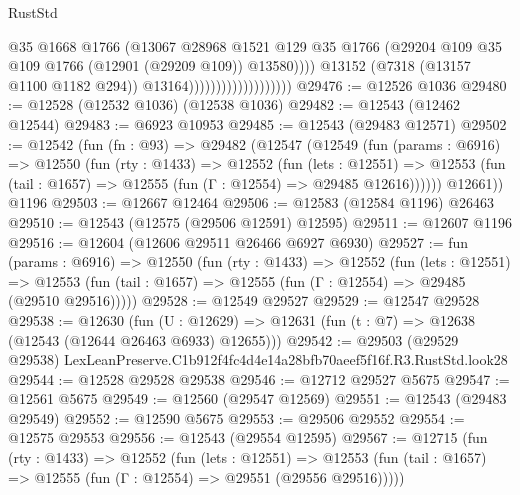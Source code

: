 \begin{lexlean}{RustStd}
\begin{coremodule}
                                              @35
                                              @1668
                                              @1766
                                              (@13067
                                                @28968
                                                @1521
                                                @129
                                                @35
                                                @1766
                                                (@29204
                                                  @109
                                                  @35
                                                  @109
                                                  @1766
                                                  (@12901 (@29209 @109))
                                                  @13580))))
                                          @13152
                                          (@7318 (@13157 @1100 @1182 @294))
                                          @13164)))))))))))))))))))
@29476 := @12526 @1036
@29480 := @12528 (@12532 @1036) (@12538 @1036)
@29482 := @12543 (@12462 @12544)
@29483 := @6923 @10953
@29485 := @12543 (@29483 @12571)
@29502 := @12542
    (fun (fn : @93) =>
    @29482
      (@12547
        (@12549
          (fun (params : @6916) =>
          @12550
            (fun (rty : @1433) =>
            @12552
              (fun (lets : @12551) =>
              @12553 (fun (tail : @1657) => @12555 (fun (Γ : @12554) => @29485 @12616))))))
        @12661))
    @1196
@29503 := @12667 @12464
@29506 := @12583 (@12584 @1196) @26463
@29510 := @12543 (@12575 (@29506 @12591) @12595)
@29511 := @12607 @1196
@29516 := @12604 (@12606 @29511 @26466 @6927 @6930)
@29527 := fun (params : @6916) =>
  @12550
    (fun (rty : @1433) =>
    @12552
      (fun (lets : @12551) =>
      @12553 (fun (tail : @1657) => @12555 (fun (Γ : @12554) => @29485 (@29510 @29516)))))
@29528 := @12549 @29527
@29529 := @12547 @29528
@29538 := @12630
    (fun (U : @12629) => @12631 (fun (t : @7) => @12638 (@12543 (@12644 @26463 @6933) @12655)))
@29542 := @29503 (@29529 @29538) LexLeanPreserve.C1b912f4fc4d4e14a28bfb70aeef5f16f.R3.RustStd.look28
@29544 := @12528 @29528 @29538
@29546 := @12712 @29527 @5675
@29547 := @12561 @5675
@29549 := @12560 (@29547 @12569)
@29551 := @12543 (@29483 @29549)
@29552 := @12590 @5675
@29553 := @29506 @29552
@29554 := @12575 @29553
@29556 := @12543 (@29554 @12595)
@29567 := @12715
    (fun (rty : @1433) =>
    @12552
      (fun (lets : @12551) =>
      @12553 (fun (tail : @1657) => @12555 (fun (Γ : @12554) => @29551 (@29556 @29516)))))

\end{coremodule}
\end{lexlean}
